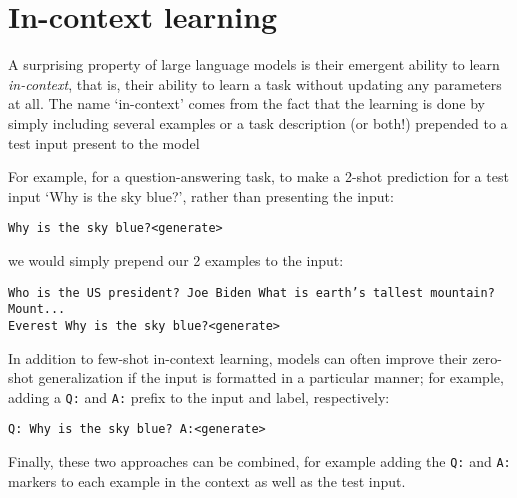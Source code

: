\section{In-context learning}

A surprising property of large language models is their emergent ability to learn \textit{in-context}, that is, their ability to learn a task without updating any parameters at all. The name `in-context' comes from the fact that the learning is done by simply including several examples or a task description (or both!) prepended to a test input present to the model

For example, for a question-answering task, to make a 2-shot prediction for a test input `Why is the sky blue?', rather than presenting the input:

\texttt{Why is the sky blue?\textless generate\textgreater}

we would simply prepend our 2 examples to the input:

\texttt{Who is the US president? Joe Biden What is earth's tallest mountain? Mount... \\
Everest Why is the sky blue?\textless generate\textgreater}

In addition to few-shot in-context learning, models can often improve their zero-shot generalization if the input is formatted in a particular manner; for example, adding a \texttt{Q:} and \texttt{A:} prefix to the input and label, respectively:

\texttt{Q: Why is the sky blue? A:\textless generate\textgreater}

Finally, these two approaches can be combined, for example adding the \texttt{Q:} and \texttt{A:} markers to each example in the context as well as the test input.

\begin{enumerate}[label={2.\alph*}]
    
    
    
\end{enumerate}